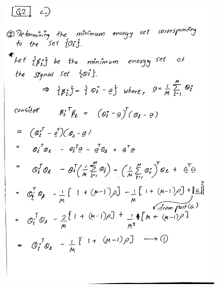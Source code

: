 \documentclass[a4paper,11pt]{article}%
\begin{document}
\begin{figure}[!h]
	\includegraphics[scale=0.22]{figures/img9}
\end{figure}
\end{document}
